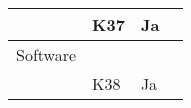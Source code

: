 \documentclass[class=article, crop=false]{standalone}
\begin{document}
\begin{table}[]
\begin{tabular}{|l|l|l|l|}
            & K37            & Ja                 &                                                                                                                                                                                                    \\ \hline
            Software        &                &                    &                                                                                                                                                                                                    \\ \hline
            & K38            & Ja                 &                                                                                                                                                                                                    \\ \hline
        \end{tabular}
    \end{table}
\end{document}
